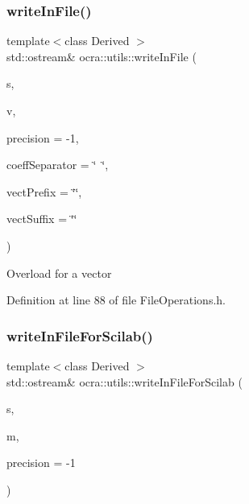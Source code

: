 \subsubsection{\texorpdfstring{write\+In\+File()}{writeInFile()}\hspace{0.1cm}{\footnotesize\ttfamily [3/3]}}
{\footnotesize\ttfamily template$<$class Derived $>$ \\
std\+::ostream\& ocra\+::utils\+::write\+In\+File (\begin{DoxyParamCaption}\item[{std\+::ostream \&}]{s,  }\item[{const Matrix\+Base$<$ Derived $>$ \&}]{v,  }\item[{int}]{precision = {\ttfamily -\/1},  }\item[{const std\+::string \&}]{coeff\+Separator = {\ttfamily \char`\"{}~\char`\"{}},  }\item[{const std\+::string \&}]{vect\+Prefix = {\ttfamily \char`\"{}\char`\"{}},  }\item[{const std\+::string \&}]{vect\+Suffix = {\ttfamily \char`\"{}\char`\"{}} }\end{DoxyParamCaption})\hspace{0.3cm}{\ttfamily [inline]}}

Overload for a vector 

Definition at line 88 of file File\+Operations.\+h.

\hypertarget{namespaceocra_1_1utils_a11933c4ad5ae5b9bdce3005941bdd433}{}\label{namespaceocra_1_1utils_a11933c4ad5ae5b9bdce3005941bdd433} 
\subsubsection{\texorpdfstring{write\+In\+File\+For\+Scilab()}{writeInFileForScilab()}}
{\footnotesize\ttfamily template$<$class Derived $>$ \\
std\+::ostream\& ocra\+::utils\+::write\+In\+File\+For\+Scilab (\begin{DoxyParamCaption}\item[{std\+::ostream \&}]{s,  }\item[{const Matrix\+Base$<$ Derived $>$ \&}]{m,  }\item[{int}]{precision = {\ttfamily -\/1} }\end{DoxyParamCaption})\hspace{0.3cm}{\ttfamily [inline]}}



